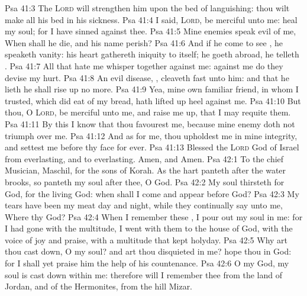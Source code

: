 \vs Psa 41:3 The \textsc{Lord} will strengthen him upon the bed of languishing: thou wilt make all his bed in his sickness.
\vs Psa 41:4 I said, \textsc{Lord}, be merciful unto me: heal my soul; for I have sinned against thee.
\vs Psa 41:5 Mine enemies speak evil of me, When shall he die, and his name perish?
\vs Psa 41:6 And if he come to see , he speaketh vanity: his heart gathereth iniquity to itself;  he goeth abroad, he telleth .
\vs Psa 41:7 All that hate me whisper together against me: against me do they devise my hurt.
\vs Psa 41:8 An evil disease, , cleaveth fast unto him: and  that he lieth he shall rise up no more.
\vs Psa 41:9 Yea, mine own familiar friend, in whom I trusted, which did eat of my bread, hath lifted up  heel against me.
\vs Psa 41:10 But thou, O \textsc{Lord}, be merciful unto me, and raise me up, that I may requite them.
\vs Psa 41:11 By this I know that thou favourest me, because mine enemy doth not triumph over me.
\vs Psa 41:12 And as for me, thou upholdest me in mine integrity, and settest me before thy face for ever.
\vs Psa 41:13 Blessed  the \textsc{Lord} God of Israel from everlasting, and to everlasting. Amen, and Amen.
\vs Psa 42:1 To the chief Musician, Maschil, for the sons of Korah. As the hart panteth after the water brooks, so panteth my soul after thee, O God.
\vs Psa 42:2 My soul thirsteth for God, for the living God: when shall I come and appear before God?
\vs Psa 42:3 My tears have been my meat day and night, while they continually say unto me, Where  thy God?
\vs Psa 42:4 When I remember these , I pour out my soul in me: for I had gone with the multitude, I went with them to the house of God, with the voice of joy and praise, with a multitude that kept holyday.
\vs Psa 42:5 Why art thou cast down, O my soul? and  art thou disquieted in me? hope thou in God: for I shall yet praise him  the help of his countenance.
\vs Psa 42:6 O my God, my soul is cast down within me: therefore will I remember thee from the land of Jordan, and of the Hermonites, from the hill Mizar.
